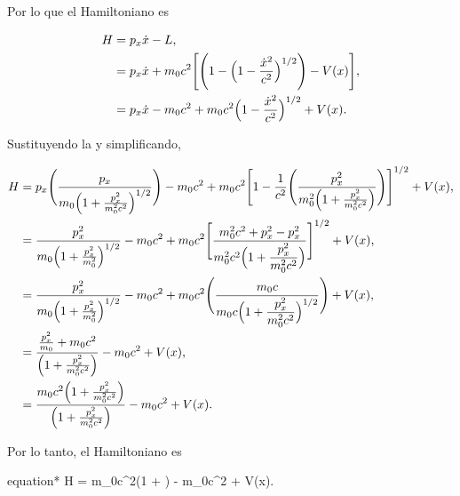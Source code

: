 \documentclass[../main.tex]{subfiles}
\begin{document}
\begin{problema}
	Por lo que el Hamiltoniano es

	\begin{align*}
		H & = p_{x} \dot{x} - L,                                                                                                 \\
		  & = p_{x} \dot{x} + m_{0}c^{2}\Biggl[\Biggl(1 - \Bigl(1 - \dfrac{\dot{x}^{2}}{c^{2}}\Bigr)^{1/2}\Biggr) - V(x)\Biggr], \\
		  & = p_{x} \dot{x} - m_{0}c^{2} + m_{0}c^{2}\Bigl(1 - \dfrac{\dot{x}^{2}}{c^{2}}\Bigr)^{1/2} + V(x).
	\end{align*}

	Sustituyendo la  y simplificando,

	\begin{align*}
		H & = p_{x}\Biggl(\dfrac{p_{x}}{m_{0}\Bigl(1 + \tfrac{p_{x}^{2}}{m_{0}^{2}c^{2}}\Bigr)^{1/2}}\Biggr)
		- m_{0}c^{2} + m_{0}c^{2}\Biggl[1 - \dfrac{1}{c^{2}}\Biggl(\dfrac{p_{x}^{2}}{m_{0}^{2}\Bigl(1 + \tfrac{p_{x}^{2}}{m_{0}^{2}c^{2}}\Bigr)}\Biggr)\Biggr]^{1/2} + V(x), \\
		  & = \dfrac{p_{x}^{2}}{m_{0}\Bigl(1 + \tfrac{p_{x}^{2}}{m_{0}^{2}}\Bigr)^{1/2}} -
		m_{0}c^{2} +
		m_{0}c^{2}\Biggl[\dfrac{m_{0}^{2}c^{2} + p_{x}^{2} - p_{x}^{2}}{m_{0}^{2}c^{2} \Bigl(1 + \dfrac{p_{x}^{2}}{m_{0}^{2}c^{2}}\Bigr)}\Biggr]^{1/2}
		+ V(x),                                                                                                                                                              \\
		  & = \dfrac{p_{x}^{2}}{m_{0}\Bigl(1 + \tfrac{p_{x}^{2}}{m_{0}^{2}}\Bigr)^{1/2}} -
		m_{0}c^{2}+ m_{0}c^{2}\Biggl(\dfrac{m_{0}c}{m_{0}c \Bigl(1 + \dfrac{p_{x}^{2}}{m_{0}^{2}c^{2}}\Bigr)^{1/2}}\Biggr)
		+ V(x),                                                                                                                                                              \\
		  & =	\dfrac{\tfrac{p_{x}^{2}}{m_{0}} + m_{0}c^{2}}{\Bigl(1 + \tfrac{p_{x}^{2}}{m_{0}^{2}c^{2}}\Bigr)} -
		m_{0}c^{2} + V(x),                                                                                                                                                   \\
		  & = \dfrac{m_{0}c^{2}\Bigl(1 + \tfrac{p_{x}^{2}}{m_{0}^{2}c^{2}}\Bigr)}{\Bigl(1 + \tfrac{p_{x}^{2}}{m_{0}^{2}c^{2}}\Bigr)} - m_{0}c^{2} + V(x).
	\end{align*}

	Por lo tanto, el Hamiltoniano es

	\begin{empheq}[box = \mainresult]{equation*}
		H = m_{0}c^{2}\Bigl(1 + \Bigr) -
		m_{0}c^{2} + V(x).
	\end{empheq}
\end{problema}
\end{document}
